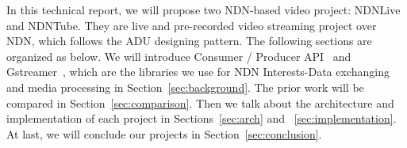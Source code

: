 In this technical report, we will propose two NDN-based video project: NDNLive and NDNTube. They are live and pre-recorded video streaming project over NDN, which follows the ADU designing pattern. The following sections are organized as below. We will introduce Consumer / Producer API~\cite{api-tr} and Gstreamer~\cite{gstreamer}, which are the libraries we use for NDN Interests-Data exchanging and media processing in Section~\ref{sec:background}. The prior work will be compared in Section~\ref{sec:comparison}. Then we talk about the architecture and implementation of each project in Sections~\ref{sec:arch} and ~\ref{sec:implementation}. At last, we will conclude our projects in Section~\ref{sec:conclusion}.

